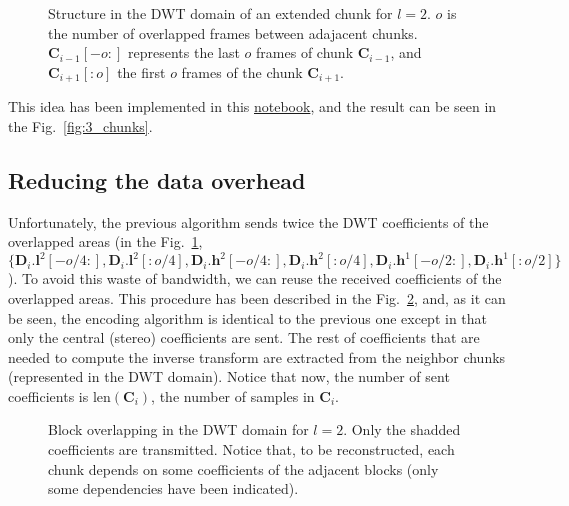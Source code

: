 
\begin{figure}
  \centering
  \caption{Structure in the DWT domain of an extended chunk for
    $l=2$. $o$ is the number of overlapped frames between adajacent
    chunks. ${\mathbf C}_{i-1}[-o:]$ represents the last $o$ frames of
    chunk ${\mathbf C}_{i-1}$, and ${\mathbf C}_{i+1}[:o]$ the first
    $o$ frames of the chunk ${\mathbf C}_{i+1}$.}
  \label{fig:subbands}
\end{figure}

This idea has been implemented in this
\href{https://github.com/Tecnologias-multimedia/intercom/blob/master/docs/overlapped_DWT_I.ipynb}{notebook},
and the result can be seen in the Fig.~\ref{fig:3_chunks}.

\subsection{Reducing the data overhead}
\label{sec:reducing}

Unfortunately, the previous algorithm sends twice the DWT coefficients
of the overlapped areas (in the Fig.~\ref{fig:subbands}, $\{{\mathbf
  D}_i.{\mathbf l}^2[-o/4:], {\mathbf D}_i.{\mathbf l}^2[:o/4],
{\mathbf D}_i.{\mathbf h}^2[-o/4:], {\mathbf D}_i.{\mathbf
  h}^2[:o/4], {\mathbf D}_i.{\mathbf h}^1[-o/2:], {\mathbf
  D}_i.{\mathbf h}^1[:o/2]\}$). To avoid this waste of bandwidth, we
can reuse the received coefficients of the overlapped areas. This
procedure has been described in the Fig.~\ref{fig:overlapping}, and,
as it can be seen, the encoding algorithm is identical to the previous
one except in that only the central (stereo) coefficients are
sent. The rest of coefficients that are needed to compute the inverse
transform are extracted from the neighbor chunks (represented in the
DWT domain). Notice that now, the number of sent coefficients is
$\text{len}({\mathbf C}_i)$, the number of samples in ${\mathbf C}_i$.

\begin{figure}
  \centering
  \caption{Block overlapping in the DWT domain for $l=2$. Only the
    shadded coefficients are transmitted. Notice that, to be
    reconstructed, each chunk depends on some coefficients of the
    adjacent blocks (only some dependencies have been indicated).}
  \label{fig:overlapping}
\end{figure}

